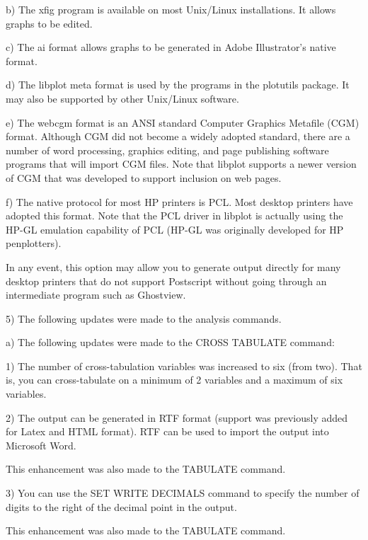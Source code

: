 {        b) The xfig program is available on most Unix/Linux installations.
           It allows graphs to be edited.

        c) The ai format allows graphs to be generated in Adobe
           Illustrator's native format.

        d) The libplot meta format is used by the programs in the
           plotutils package.  It may also be supported by other
           Unix/Linux software.

        e) The webcgm format is an ANSI standard Computer Graphics Metafile
           (CGM) format.  Although CGM did not become a widely adopted
           standard, there are a number of word processing, graphics editing,
           and page publishing software programs that will import CGM files.
           Note that libplot supports a newer version of CGM that was
           developed to support inclusion on web pages.

        f) The native protocol for most HP printers is PCL.  Most desktop
           printers have adopted this format.  Note that the PCL driver in
           libplot is actually using the HP-GL emulation capability of
           PCL (HP-GL was originally developed for HP penplotters).

           In any event, this option may allow you to generate output
           directly for many desktop printers that do not support Postscript
           without going through an intermediate program such as Ghostview.

 5) The following updates were made to the analysis commands.

    a) The following updates were made to the CROSS TABULATE command:

       1) The number of cross-tabulation variables was increased to
          six (from two).  That is, you can cross-tabulate on a
          minimum of 2 variables and a maximum of six variables.

       2) The output can be generated in RTF format (support was
          previously added for Latex and HTML format).  RTF can
          be used to import the output into Microsoft Word.

          This enhancement was also made to the TABULATE command.

       3) You can use the SET WRITE DECIMALS command to specify
          the number of digits to the right of the decimal point
          in the output.

          This enhancement was also made to the TABULATE command.

}
